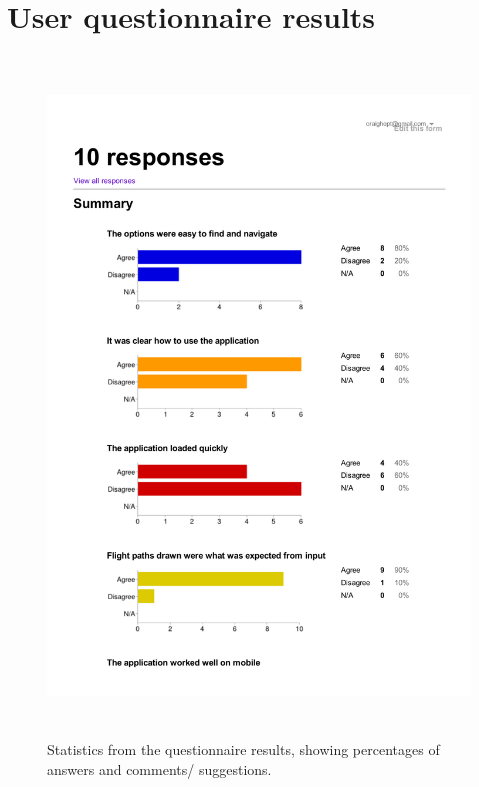 \section{User questionnaire results}
\label{test:questionnaireResults}
\begin{figure}[h!]
    \caption{Statistics from the questionnaire results, showing percentages of answers and comments/ suggestions.}
    \includegraphics[width=15cm,height=18cm,page=1]{images/questionnaireResults.pdf}
\end{figure}


